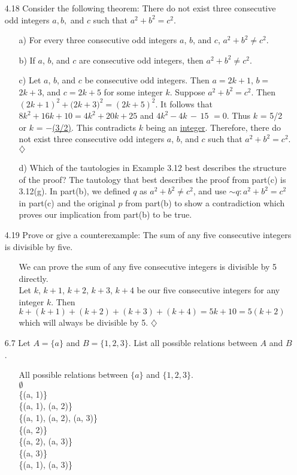 \documentclass[12pt]{article}
\begin{document}
\begin{enumerate}
\item[4.18] Consider the following theorem: There do not exist three consecutive odd integers $a, b,$ and $c$ such that $a^2 + b^2 = c^2$.
\begin{enumerate}
\item[a)] For every three consecutive odd integers $a$, $b$, and $c$, \underline{$a^2 + b^2 \neq c^2$}.
\item[b)] If $a$, $b$, and $c$ are consecutive odd integers, then \underline{$a^2 + b^2 \neq c^2$}.
\item[c)] Let $a$, $b$, and $c$ be consecutive odd integers. Then $a = 2k + 1$, $b = $\underline{
$2k + 3$}, and $c = 2k + 5$ for some integer $k$. Suppose $a^2 + b^2 = c^2$. Then \\
$(2k + 1)^2 + ($\underline{$2k + 3$}$)^2 = (2k + 5)^2$. It follows that $8k^2 + 16k + 10 =
4k^2 + 20k + 25$ and $4k^2 - 4k\, - $\underline{$\,15$} $= 0$. Thus $k$ = 5/2 or $k$ = 
\underline{$-$(3/2)}. This contradicts $k$ being an \underline{integer}. Therefore, there do not
exist three consecutive odd integers $a$, $b$, and $c$ such that $a^2 + b^2 = c^2$. $\diamondsuit$
\item[d)] Which of the tautologies in Example 3.12 best describes the structure of the proof?
The tautology that best describes the proof from part(c) is 3.12(g). In part(b), we defined $q$ as $a^2 + b^2 \neq c^2$, and use $\sim$$q: a^2 + b^2 = c^2$ in part(c) and the original $p$ from part(b) to show a contradiction which proves our implication from part(b) to be true.
\end{enumerate}

\item[4.19] Prove or give a counterexample: The sum of any five consecutive integers is divisible by five.
\begin{enumerate}
\item[] We can prove the sum of any five consecutive integers is divisible by 5 directly. \\
Let $k$, $k + 1$, $k + 2$, $k + 3$, $k + 4$ be our five consecutive integers
for any integer $k$. Then $k + (k + 1) + (k + 2) + (k + 3) + (k + 4) = 5k + 10 = 5(k + 2)$ which will always
be divisible by 5. $\diamondsuit$
\end{enumerate}

\item[6.7] Let $A = \{ a \}$ and $B = \{ 1, 2, 3 \}$. List all possible relations between $A$ and $B$.
\begin{enumerate}
\item[]
All possible relations between $\{a\}$ and $\{1, 2, 3\}$. \\
$\emptyset$ \\
\{(a, 1)\}  \\ 
\{(a, 1), (a, 2)\} \\ 
\{(a, 1), (a, 2), (a, 3)\} \\ 
\{(a, 2)\} \\
\{(a, 2), (a, 3)\} \\
\{(a, 3)\} \\
\{(a, 1), (a, 3)\} 
\end{enumerate}


\end{enumerate}
\end{document}
